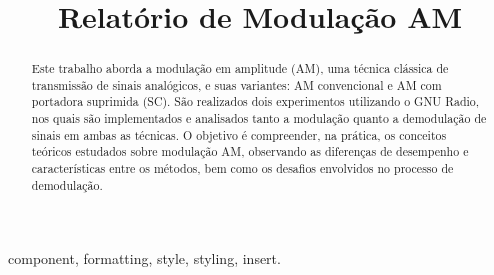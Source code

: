 \documentclass[conference]{IEEEtran}
\begin{document}
\title{Relatório de Modulação AM}

\author{
}

\maketitle

\fancyhead{}

\begin{abstract}
Este trabalho aborda a modulação em amplitude (AM), uma técnica clássica de transmissão de sinais analógicos, e suas variantes: AM convencional e AM com portadora suprimida (SC). São realizados dois experimentos utilizando o GNU Radio, nos quais são implementados e analisados tanto a modulação quanto a demodulação de sinais em ambas as técnicas. O objetivo é compreender, na prática, os conceitos teóricos estudados sobre modulação AM, observando as diferenças de desempenho e características entre os métodos, bem como os desafios envolvidos no processo de demodulação.
\end{abstract}

\begin{IEEEkeywords}
component, formatting, style, styling, insert.
\end{IEEEkeywords}








\vspace{12pt}
\end{document}
